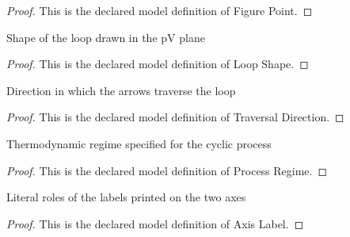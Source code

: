\begin{proof}
  This is the declared model definition of Figure Point.
\end{proof}
\begin{definition}
  \label{def:physics:phyx-mini-0357:phyxminiproblems-problemphyxmini0357-loopshape}
  Shape of the loop drawn in the pV plane
\end{definition}
\begin{proof}
  This is the declared model definition of Loop Shape.
\end{proof}
\begin{definition}
  \label{def:physics:phyx-mini-0357:phyxminiproblems-problemphyxmini0357-traversaldirection}
  Direction in which the arrows traverse the loop
\end{definition}
\begin{proof}
  This is the declared model definition of Traversal Direction.
\end{proof}
\begin{definition}
  \label{def:physics:phyx-mini-0357:phyxminiproblems-problemphyxmini0357-processregime}
  Thermodynamic regime specified for the cyclic process
\end{definition}
\begin{proof}
  This is the declared model definition of Process Regime.
\end{proof}
\begin{definition}
  \label{def:physics:phyx-mini-0357:phyxminiproblems-problemphyxmini0357-axislabel}
  Literal roles of the labels printed on the two axes
\end{definition}
\begin{proof}
  This is the declared model definition of Axis Label.
\end{proof}
